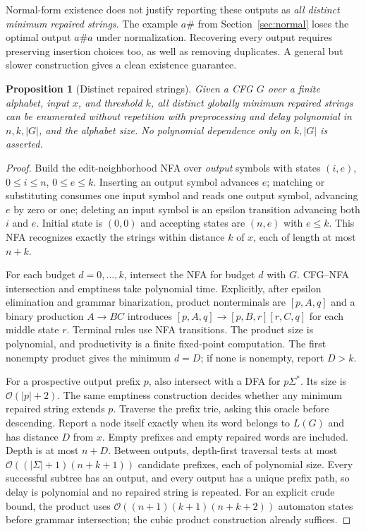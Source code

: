 \documentclass[sigconf,screen]{acmart}
\newcommand{\Oh}{\mathcal O}
\newtheorem{proposition}[theorem]{Proposition}
\theoremstyle{definition}
\begin{document}
Normal-form existence does not justify reporting these outputs as \emph{all distinct minimum repaired strings}. The example $a\#$ from Section~\ref{sec:normal} loses the optimal output $a\#a$ under normalization. Recovering every output requires preserving insertion choices too, as well as removing duplicates. A general but slower construction gives a clean existence guarantee.

\begin{proposition}[Distinct repaired strings]\label{prop:strings}
Given a CFG $G$ over a finite alphabet, input $x$, and threshold $k$, all distinct globally minimum repaired strings can be enumerated without repetition with preprocessing and delay polynomial in $n,k,|G|$, and the alphabet size. No polynomial dependence only on $k,|G|$ is asserted.
\end{proposition}
\begin{proof}
Build the edit-neighborhood NFA over \emph{output} symbols with states $(i,e)$, $0\le i\le n$, $0\le e\le k$. Inserting an output symbol advances $e$; matching or substituting consumes one input symbol and reads one output symbol, advancing $e$ by zero or one; deleting an input symbol is an epsilon transition advancing both $i$ and $e$. Initial state is $(0,0)$ and accepting states are $(n,e)$ with $e\le k$. This NFA recognizes exactly the strings within distance $k$ of $x$, each of length at most $n+k$.

For each budget $d=0,\ldots,k$, intersect the NFA for budget $d$ with $G$. CFG--NFA intersection and emptiness take polynomial time. Explicitly, after epsilon elimination and grammar binarization, product nonterminals are $[p,A,q]$ and a binary production $A\to BC$ introduces $[p,A,q]\to[p,B,r][r,C,q]$ for each middle state $r$. Terminal rules use NFA transitions. The product size is polynomial, and productivity is a finite fixed-point computation. The first nonempty product gives the minimum $d=D$; if none is nonempty, report $D>k$.

For a prospective output prefix $p$, also intersect with a DFA for $p\Sigma^*$. Its size is $\Oh(|p|+2)$. The same emptiness construction decides whether any minimum repaired string extends $p$. Traverse the prefix trie, asking this oracle before descending. Report a node itself exactly when its word belongs to $L(G)$ and has distance $D$ from $x$. Empty prefixes and empty repaired words are included. Depth is at most $n+D$. Between outputs, depth-first traversal tests at most $\Oh((|\Sigma|+1)(n+k+1))$ candidate prefixes, each of polynomial size. Every successful subtree has an output, and every output has a unique prefix path, so delay is polynomial and no repaired string is repeated. For an explicit crude bound, the product uses $\Oh((n+1)(k+1)(n+k+2))$ automaton states before grammar intersection; the cubic product construction already suffices.
\end{proof}
\end{document}
